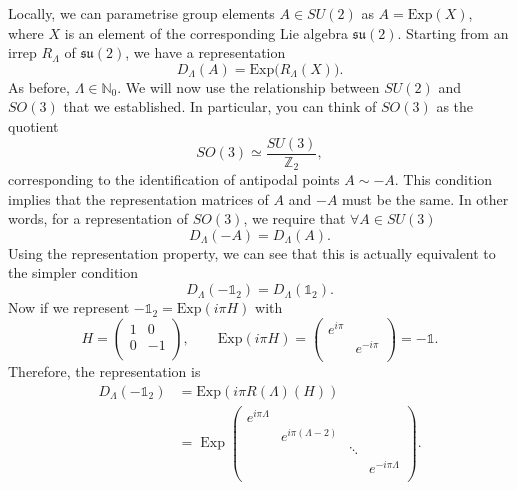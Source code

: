Locally, we can parametrise group elements $A \in SU(2)$ as $A = \text{Exp}(X)$, where $X$ is an element of the corresponding Lie algebra $\mathfrak{su}(2)$.
Starting from an irrep $R_\Lambda$ of $\mathfrak{su}(2)$, we have a representation 
\begin{equation}
  D_\Lambda(A) = \text{Exp} \bigl(R_\Lambda(X)\bigr).
\end{equation}
As before, $\Lambda \in \mathbb{N}_0$.
We will now use the relationship between $SU(2)$ and $SO(3)$ that we established. In particular, you can think of $SO(3)$ as the quotient
\begin{equation}
  SO(3) \simeq \frac{SU(3)}{\mathbb{Z}_2},
\end{equation}
corresponding to the identification of antipodal points $A \sim -A$.
This condition implies that the representation matrices of $A$ and $-A$ must be the same.
In other words, for a representation of $SO(3)$, we require that $\forall A \in SU(3)$
\begin{equation}
  D_\Lambda(-A) = D_\Lambda(A).
\end{equation}
Using the representation property, we can see that this is actually equivalent to the simpler condition
\begin{equation}
  D_\Lambda (-\mathbb{1}_2) = D_{\Lambda}(\mathbb{1}_2).
\end{equation}
Now if we represent $-\mathbb{1}_2 = \text{Exp}(i\pi H)$ with 
\begin{equation}
  H = 
  \begin{pmatrix}
   1 & 0 \\
   0 & -1 \\
  \end{pmatrix}, 
  \qquad \text{Exp}(i \pi H) = 
  \begin{pmatrix}
   e^{i\pi} &  \\
    & e^{-i\pi} \\
  \end{pmatrix} = -\mathbb{1}.
\end{equation}
Therefore, the representation is
\begin{align}
  D_\Lambda(-\mathbb{1}_2) &= \text{Exp}(i\pi R(\Lambda)(H)) \\
			   &= \operatorname{Exp}
           \begin{pmatrix}
            e^{i\pi \Lambda} &  &  &  \\
			     & e^{i \pi (\Lambda - 2)} &  &  \\
             &  & \ddots &  \\
             &  &  & e^{-i \pi \Lambda} \\
           \end{pmatrix}.
\end{align}

